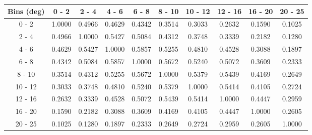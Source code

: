 \documentclass[aps, prd, reprint,showpacs,  preprintnumbers,amsmath,amssymb,superscriptaddress, nofootinbib]{revtex4-1}
\makeatletter
\renewenvironment{table}
  {\def\@captype{table}}
  {}
\makeatother
\begin{document}
\begin{table}
\centering
\begin{tabular}{cccccccccc}
\hline
    Bins (deg) &       0 -  2 &       2 -  4 &       4 -  6 &       6 -  8 &       8 - 10 &      10 - 12 &      12 - 16 &      16 - 20 &      20 - 25 \\ 
\hline
  0 -  2  & 1.0000  & 0.4966  & 0.4629  & 0.4342  & 0.3514  & 0.3033  & 0.2632  & 0.1590  & 0.1025 \\
  2 -  4  & 0.4966  & 1.0000  & 0.5427  & 0.5084  & 0.4312  & 0.3748  & 0.3339  & 0.2182  & 0.1280 \\
  4 -  6  & 0.4629  & 0.5427  & 1.0000  & 0.5857  & 0.5255  & 0.4810  & 0.4528  & 0.3088  & 0.1897 \\
  6 -  8  & 0.4342  & 0.5084  & 0.5857  & 1.0000  & 0.5672  & 0.5240  & 0.5072  & 0.3609  & 0.2333 \\
  8 - 10  & 0.3514  & 0.4312  & 0.5255  & 0.5672  & 1.0000  & 0.5379  & 0.5439  & 0.4169  & 0.2649 \\
 10 - 12  & 0.3033  & 0.3748  & 0.4810  & 0.5240  & 0.5379  & 1.0000  & 0.5414  & 0.4105  & 0.2724 \\
 12 - 16  & 0.2632  & 0.3339  & 0.4528  & 0.5072  & 0.5439  & 0.5414  & 1.0000  & 0.4447  & 0.2959 \\
 16 - 20  & 0.1590  & 0.2182  & 0.3088  & 0.3609  & 0.4169  & 0.4105  & 0.4447  & 1.0000  & 0.2605 \\
 20 - 25  & 0.1025  & 0.1280  & 0.1897  & 0.2333  & 0.2649  & 0.2724  & 0.2959  & 0.2605  & 1.0000 \\
\hline
\hline
\end{tabular}
\caption{Correlation matrix for bins of $d\sigma/d\theta_\mu$.}
\label{tb:piz_muth_cov}
\end{table}

\vspace{0.7cm}
\end{document}
